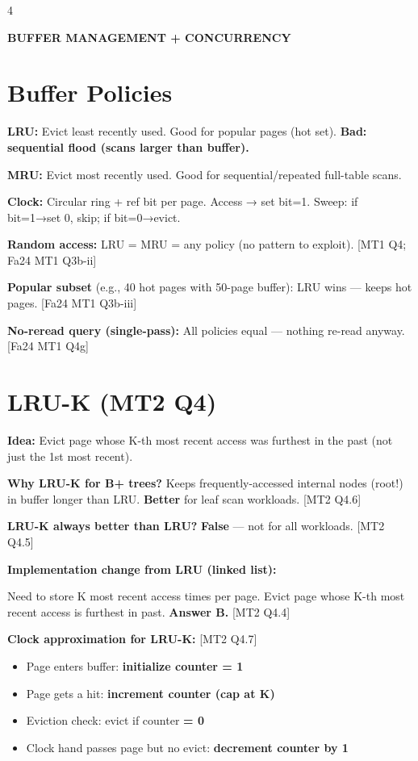 \documentclass[8pt,letterpaper]{article}
\newcommand{\titlefont}{\fontsize{6.5}{7.5}\selectfont}
\newcommand{\key}[1]{\textbf{\color{red!70!black}#1}}
\newcommand{\ans}[1]{\textbf{\color{blue!80!black}#1}}
\newcommand{\warn}[1]{\textbf{\color{orange!85!black}#1}}
\newcommand{\qref}[1]{{\fontsize{3.5}{4}\selectfont\color{purple!60!black}[#1]}}
\begin{document}
\begin{multicols*}{4}
\centerline{\titlefont\textbf{\color{purple!80!black}BUFFER MANAGEMENT + CONCURRENCY}}
\vspace{1pt}

\section{Buffer Policies}
\key{LRU:} Evict least recently used. Good for popular pages (hot set). \warn{Bad: sequential flood (scans larger than buffer).}

\key{MRU:} Evict most recently used. Good for sequential/repeated full-table scans.

\key{Clock:} Circular ring + ref bit per page. Access → set bit=1. Sweep: if bit=1→set 0, skip; if bit=0→evict.

\key{Random access:} LRU = MRU = any policy (no pattern to exploit). \qref{MT1 Q4; Fa24 MT1 Q3b-ii}

\key{Popular subset} (e.g., 40 hot pages with 50-page buffer): LRU wins — keeps hot pages. \qref{Fa24 MT1 Q3b-iii}

\key{No-reread query (single-pass):} All policies equal — nothing re-read anyway. \qref{Fa24 MT1 Q4g}

\section{LRU-K (MT2 Q4)}
\key{Idea:} Evict page whose K-th most recent access was furthest in the past (not just the 1st most recent).

\key{Why LRU-K for B+ trees?} Keeps frequently-accessed internal nodes (root!) in buffer longer than LRU. \textbf{Better} for leaf scan workloads. \qref{MT2 Q4.6}

\key{LRU-K always better than LRU?} \ans{False} — not for all workloads. \qref{MT2 Q4.5}

\key{Implementation change from LRU (linked list):}
\begin{ansbox}
Need to store K most recent access times per page. Evict page whose K-th most recent access is furthest in past. \textbf{Answer B.} \qref{MT2 Q4.4}
\end{ansbox}

\key{Clock approximation for LRU-K:} \qref{MT2 Q4.7}
\begin{itemize}
  \item Page enters buffer: \ans{initialize counter = 1}
  \item Page gets a hit: \ans{increment counter (cap at K)}
  \item Eviction check: evict if counter \ans{= 0}
  \item Clock hand passes page but no evict: \ans{decrement counter by 1}
\end{itemize}


\end{multicols*}
\end{document}
